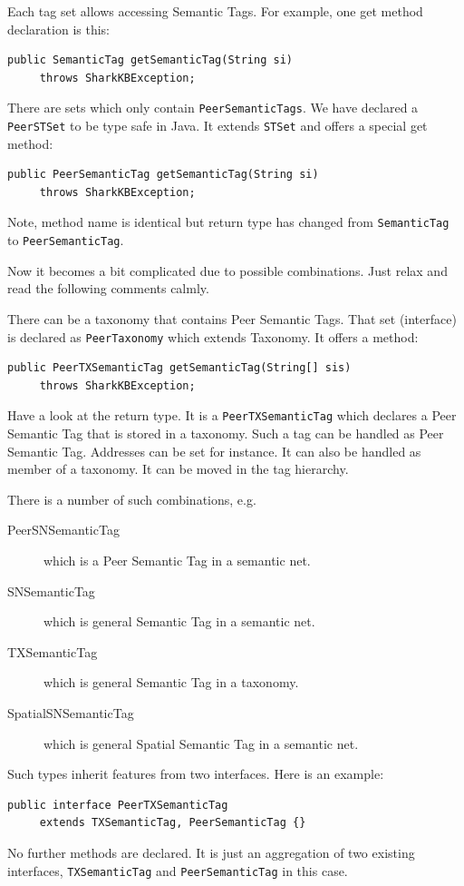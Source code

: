 Each tag set allows accessing Semantic Tags. For example, one get method declaration is this:

\begin{verbatim}
public SemanticTag getSemanticTag(String si) 
     throws SharkKBException;
\end{verbatim}

There are sets which only contain {\tt PeerSemanticTags}. We have declared a {\tt PeerSTSet} to be type safe in Java. It extends {\tt STSet} and offers a special get method:

\begin{verbatim}
public PeerSemanticTag getSemanticTag(String si) 
     throws SharkKBException;
\end{verbatim}

Note, method name is identical but return type has changed from {\tt SemanticTag} to {\tt PeerSemanticTag}.

Now it becomes a bit complicated due to possible combinations. Just relax and read the following comments calmly. 

There can be a taxonomy that contains Peer Semantic Tags. That set (interface) is declared as {\tt PeerTaxonomy} which extends Taxonomy. It offers a method:

\begin{verbatim}
public PeerTXSemanticTag getSemanticTag(String[] sis) 
     throws SharkKBException;
\end{verbatim}

Have a look at the return type. It is a {\tt PeerTXSemanticTag} which declares a Peer Semantic Tag that is stored in a taxonomy. Such a tag can be handled as Peer Semantic Tag. Addresses can be set for instance. It can also be handled as member of a taxonomy. It can be moved in the tag hierarchy.

There is a number of such combinations, e.g.

\begin{description}
\item[PeerSNSemanticTag] which is a Peer Semantic Tag in a semantic net.
\item[SNSemanticTag] which is general Semantic Tag in a semantic net.
\item[TXSemanticTag] which is general Semantic Tag in a taxonomy.
\item[SpatialSNSemanticTag] which is general Spatial Semantic Tag in a semantic net.
\end{description}

Such types inherit features from two interfaces. Here is an example:
\begin{verbatim}
public interface PeerTXSemanticTag 
     extends TXSemanticTag, PeerSemanticTag {}
\end{verbatim}
No further methods are declared. It is just an aggregation of two existing interfaces, {\tt TXSemanticTag} and {\tt PeerSemanticTag} in this case.


